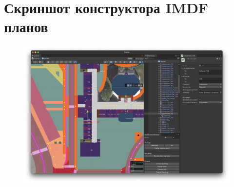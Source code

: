 \chapter{Скриншот конструктора IMDF планов}
  \label{appendix:editor}
  \begin{figure}[H]
    \includegraphics[width=1\textwidth]{assets/appendix/editor.jpg}
  \end{figure}
